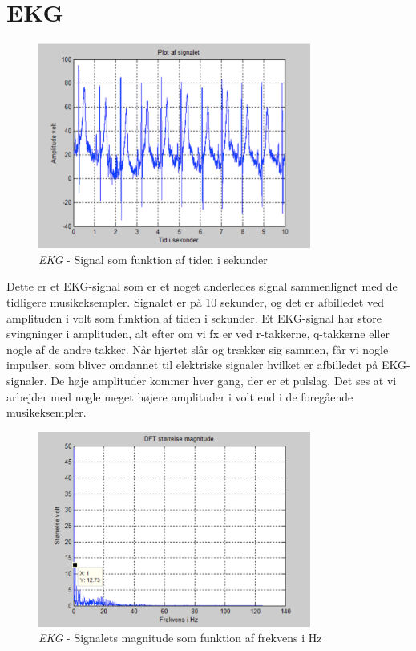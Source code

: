 \section{EKG}

\begin{figure}[H]
	\centering
	\includegraphics[width=0.8\textwidth]{Figurer/EKG}
	\caption{\textit{EKG} - Signal som funktion af tiden i sekunder}
\end{figure}

Dette er et EKG-signal som er et noget anderledes signal sammenlignet med de tidligere musikeksempler. Signalet er på 10 sekunder, og det er afbilledet ved amplituden i volt som funktion af tiden i sekunder. Et EKG-signal har store svingninger i amplituden, alt efter om vi fx er ved r-takkerne, q-takkerne eller nogle af de andre takker. Når hjertet slår og trækker sig sammen, får vi nogle impulser, som bliver omdannet til elektriske signaler hvilket er afbilledet på EKG-signaler. De høje amplituder kommer hver gang, der er et pulslag. Det ses at vi arbejder med nogle meget højere amplituder i volt end i de foregående musikeksempler. 

\begin{figure}[H]
	\centering
	\includegraphics[width=0.8\textwidth]{Figurer/EKG2}
	\caption{\textit{EKG} - Signalets magnitude som funktion af frekvens i Hz}
\end{figure}


